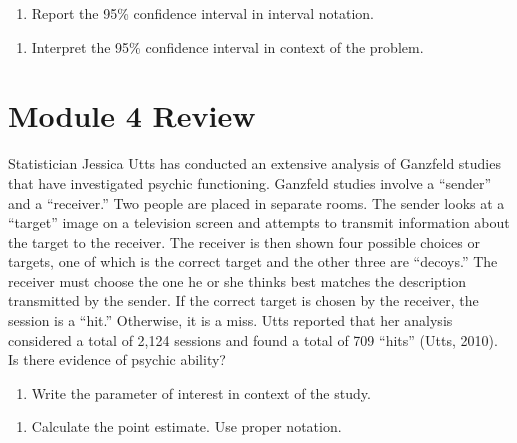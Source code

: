 \documentclass[
]{report}
\providecommand{\tightlist}{%
  \setlength{\itemsep}{0pt}\setlength{\parskip}{0pt}}
\begin{document}
\vspace{1in}

\begin{enumerate}
\def\labelenumi{\arabic{enumi}.}
\setcounter{enumi}{12}
\tightlist
\item
  Report the 95\% confidence interval in interval notation.
\end{enumerate}

\vspace{0.2in}

\begin{enumerate}
\def\labelenumi{\arabic{enumi}.}
\setcounter{enumi}{13}
\tightlist
\item
  Interpret the 95\% confidence interval in context of the problem.
\end{enumerate}

\vspace{0.8in}

\newpage

\section{Module 4 Review}\label{module-4-review}

Statistician Jessica Utts has conducted an extensive analysis of Ganzfeld studies that have investigated psychic functioning. Ganzfeld studies involve a ``sender'' and a ``receiver.'' Two people are placed in separate rooms. The sender looks at a ``target'' image on a television screen and attempts to transmit information about the target to the receiver. The receiver is then shown four possible choices or targets, one of which is the correct target and the other three are ``decoys.'' The receiver must choose the one he or she thinks best matches the description transmitted by the sender. If the correct target is chosen by the receiver, the session is a ``hit.'' Otherwise, it is a miss. Utts reported that her analysis considered a total of 2,124 sessions and found a total of 709 ``hits'' (Utts, 2010). Is there evidence of psychic ability?

\begin{enumerate}
\def\labelenumi{\arabic{enumi}.}
\tightlist
\item
  Write the parameter of interest in context of the study.
\end{enumerate}

\vspace{0.6in}

\begin{enumerate}
\def\labelenumi{\arabic{enumi}.}
\setcounter{enumi}{1}
\tightlist
\item
  Calculate the point estimate. Use proper notation.
\end{enumerate}
\end{document}
